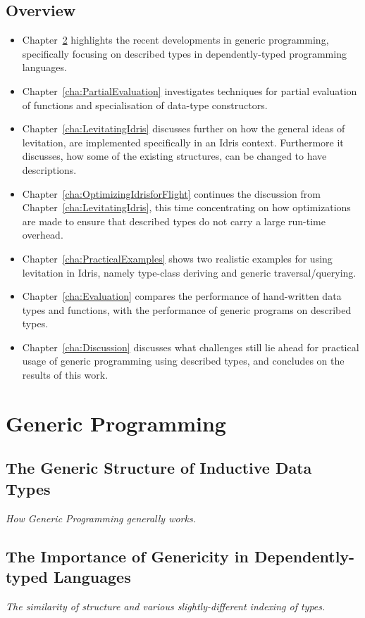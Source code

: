 \documentclass{ituthesis}
\begin{document}
\section{Overview}
\label{sec:Overview}
\begin{itemize} %
  \item Chapter~\ref{cha:GenericProgramming} highlights the recent developments in generic programming, specifically focusing on described types in dependently-typed programming languages.
  \item Chapter~\ref{cha:PartialEvaluation} investigates techniques for partial evaluation of functions and specialisation of data-type constructors.
  \item Chapter~\ref{cha:LevitatingIdris} discusses further on how the general ideas of levitation, are implemented specifically in an Idris context. Furthermore it discusses, how some of the existing structures,
    can be changed to have descriptions.
  \item Chapter~\ref{cha:OptimizingIdrisforFlight} continues the discussion from Chapter~\ref{cha:LevitatingIdris}, this time concentrating on how optimizations are made
    to ensure that described types do not carry a large run-time overhead.
  \item Chapter~\ref{cha:PracticalExamples} shows two realistic examples for using levitation in Idris, namely type-class deriving and generic traversal/querying.
  \item Chapter~\ref{cha:Evaluation} compares the performance of hand-written data types and functions, with the performance of generic programs on described types.
  \item Chapter~\ref{cha:Discussion} discusses what challenges still lie ahead for practical usage of generic programming using described types, and concludes on the results of this work.
\end{itemize}
\chapter{Generic Programming}
\label{cha:GenericProgramming}
\section{The Generic Structure of Inductive Data Types}
\label{sec:TheGenericStructureofInductiveDataTypes}
\textit{How Generic Programming generally works.}
\section{The Importance of Genericity in Dependently-typed Languages}
\label{sec:TheImportanceofGenericityinDependently-typedLanguages}
\textit{The similarity of structure and various slightly-different indexing of types.}
\end{document}
